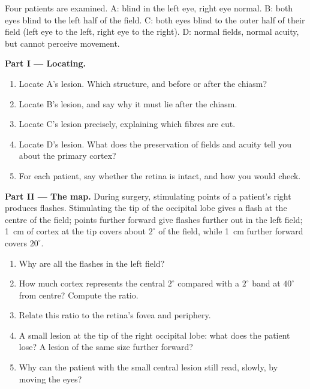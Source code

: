 \begin{problem}
\label{pb:g11:vision-and-brain:1}
Four patients are examined. A: blind in the left eye, right eye
normal. B: both eyes blind to the left half of the field. C: both eyes
blind to the outer half of their field (left eye to the left, right
eye to the right). D: normal fields, normal acuity, but cannot
perceive movement.

\medskip
\noindent\textbf{Part I --- Locating.}
\begin{enumerate}
  \item Locate A's lesion. Which structure, and before or after the
        chiasm?
  \item Locate B's lesion, and say why it must lie after the chiasm.
  \item Locate C's lesion precisely, explaining which fibres are cut.
  \item Locate D's lesion. What does the preservation of fields and
        acuity tell you about the primary cortex?
  \item For each patient, say whether the retina is intact, and how
        you would check.
\end{enumerate}

\medskip
\noindent\textbf{Part II --- The map.}
During surgery, stimulating points of a patient's right 
produces flashes. Stimulating the tip of the occipital lobe gives a
flash at the centre of the field; points further forward give flashes
further out in the left field; \qty{1}{cm} of cortex at the tip covers
about $2^\circ$ of the field, while \qty{1}{cm} further forward covers
$20^\circ$.
\begin{enumerate}[resume]
  \item Why are all the flashes in the left field?
  \item How much cortex represents the central $2^\circ$ compared with
        a $2^\circ$ band at $40^\circ$ from centre? Compute the ratio.
  \item Relate this ratio to the retina's fovea and periphery.
  \item A small lesion at the tip of the right occipital lobe: what
        does the patient lose? A lesion of the same size further
        forward?
  \item Why can the patient with the small central lesion still read,
        slowly, by moving the eyes?
\end{enumerate}


\end{problem}
